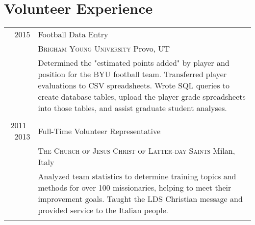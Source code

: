 \documentclass[a4paper,10pt]{article}
\begin{document}
\section{Volunteer Experience}
\begin{tabular}{r|p{11cm}}
  \textsc{2015} & Football Data Entry \\
  & \textsc{Brigham Young University} Provo, UT \\
  & \footnotesize{Determined the "estimated points added" by player and position for the BYU football team. Transferred player evaluations to CSV spreadsheets. Wrote SQL queries to create database tables, upload the player grade spreadsheets into those tables, and assist graduate student analyses.} \\ \multicolumn{2}{c}{} \\
  
  \textsc{2011--2013} & Full-Time Volunteer Representative \\
  & \textsc{The Church of Jesus Christ of Latter-day Saints} Milan, Italy \\
  & \footnotesize{Analyzed team statistics to determine training topics and methods for over 100 missionaries, helping to meet their improvement goals. Taught the LDS Christian message and provided service to the Italian people.} \\ \multicolumn{2}{c}{}
\end{tabular}


%   
%   
%   
\end{document}
